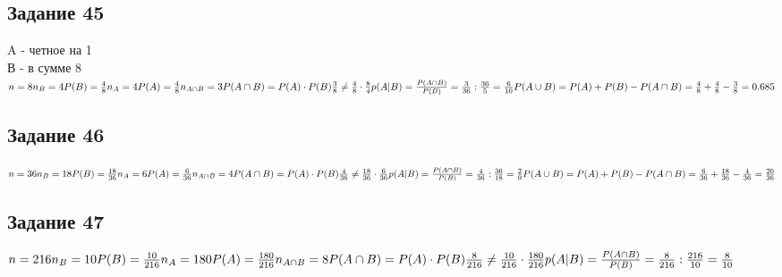 \documentclass[12pt]{article}
\begin{document}
\newpage
\subsection{Задание 45}
A - четное на 1\\
В - в сумме 8\\
$
n=8\\
 n_B=4\\
P(B)=\frac{4}{8}\\
n_{A}=4\\
P(A)=\frac{4}{8}\\
n_{A\cap B}=3\\
P(A\cap B)=P(A)\cdot P(B)\\
\frac{3}{8} \neq \frac{4}{8} \cdot \frac{8}{4} \\
p(A|B)=\frac{P(A\cap B)}{P(B)}=\frac{3}{36} : \frac{36}{5}=\frac{6}{10}\\
P(A\cup B)=P(A)+P(B)-P(A\cap B)=\frac{4}{8} + \frac{4}{8} - \frac{3}{8} = 0.685
$

\newpage
\subsection{Задание 46}

$
n=36\\
 n_B=18\\
P(B)=\frac{18}{36}\\
n_{A}=6\\
P(A)=\frac{6}{36}\\
n_{A\cap B}=4\\
P(A\cap B)=P(A)\cdot P(B)\\
\frac{4}{36} \neq \frac{18}{36} \cdot \frac{6}{36} \\
p(A|B)=\frac{P(A\cap B)}{P(B)}=\frac{4}{36} : \frac{36}{18}=\frac{2}{9}\\
P(A\cup B)=P(A)+P(B)-P(A\cap B)=\frac{6}{36} + \frac{18}{36} - \frac{4}{36} = \frac{20}{36}
$

\newpage
\subsection{Задание 47}

$
n=216\\
 n_B=10\\
P(B)=\frac{10}{216}\\
n_{A}=180\\
P(A)=\frac{180}{216}\\
n_{A\cap B}=8\\
P(A\cap B)=P(A)\cdot P(B)\\
\frac{8}{216} \neq \frac{10}{216} \cdot \frac{180}{216} \\
p(A|B)=\frac{P(A\cap B)}{P(B)}=\frac{8}{216} : \frac{216}{10}=\frac{8}{10}\\
$
\end{document}
